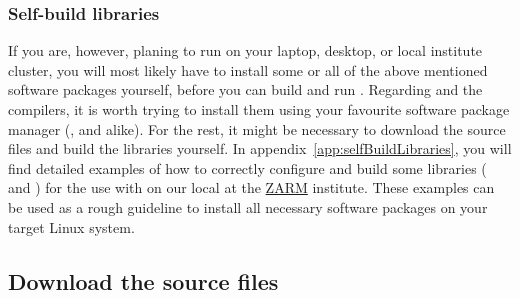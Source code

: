 \documentclass[a4paper, 11pt, DIV=11]{scrartcl}
\begin{document}
\subsubsection{Self-build libraries}
\label{sec:selfBuildLibraries}

If you are, however, planing to run \nsc on your laptop, desktop, or local
institute cluster, you will most likely have to install some or all of the above
mentioned software packages yourself, before you can build and run \nsc. 
Regarding \mpi and the compilers, it is worth trying to install them using your 
favourite software package manager (,  and alike). For
the rest, it might be necessary to download the source files and 
build the libraries yourself. In appendix~\ref{app:selfBuildLibraries}, you will find detailed
examples of how to correctly configure and build some libraries ( and 
\hdf) for the use with \nsc on our local  at the  
\href{https://www.zarm.uni-bremen.de/en/}{ZARM} institute. 
These examples can be used as a rough guideline to install all necessary software
packages on your target Linux system.

\subsection{Download the source files}
\label{sec:download}
\end{document}
